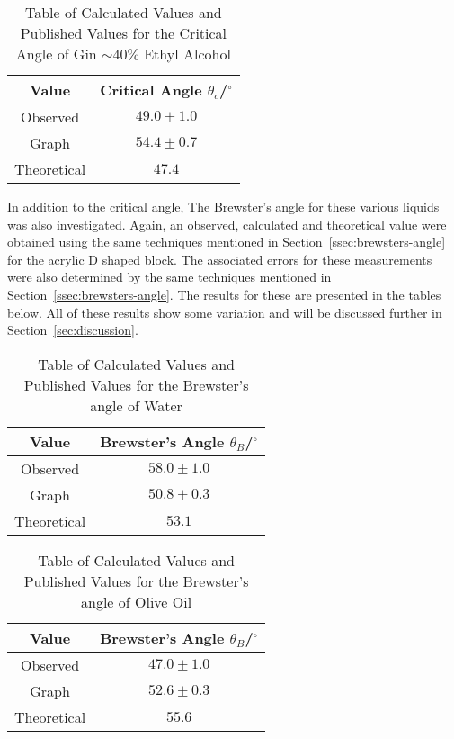\documentclass{article}
\newcommand{\secref}[2][Section~]{#1\ref{#2}}
\begin{document}
\vspace{5mm}
\begin{table*}[h]
\centering %
\caption{Table of Calculated Values and Published Values for the Critical Angle of Gin $\sim40\%$ Ethyl Alcohol}
\label{tab:table-gin2}
\begin{tabular}{|c|c|}
\hline
Value & Critical Angle $\theta_c$/$^{\circ}$ \\
\hline
Observed & $49.0\pm 1.0$  \\
\hline
Graph & $54.4 \pm 0.7$ \\
\hline
Theoretical \cite{Web02} & $47.4$ \\
\hline
\end{tabular}
\end{table*}

\cleardoublepage
\noindent
In addition to the critical angle, The Brewster's angle for these various liquids was also investigated. Again, an observed, calculated and theoretical value were obtained using the same techniques mentioned in \secref{ssec:brewsters-angle} for the acrylic D shaped block. The associated errors for these measurements were also determined by the same techniques mentioned in \secref{ssec:brewsters-angle}. The results for these are presented in the tables below. All of these results show some variation and will be discussed further in \secref{sec:discussion}.

\vspace{10mm}
\begin{table*}[h]
\centering %
\caption{Table of Calculated Values and Published Values for the Brewster's angle of Water}
\label{tab:table-water3}
\begin{tabular}{|c|c|}
\hline
Value & Brewster's Angle $\theta_B$/$^{\circ}$ \\
\hline
Observed & $58.0 \pm 1.0$  \\
\hline
Graph & $50.8 \pm 0.3$ \\
\hline
Theoretical \cite{Web01} & $53.1$ \\
\hline
\end{tabular}
\end{table*}

\vspace{10mm}
\begin{table*}[h]
\centering %
\caption{Table of Calculated Values and Published Values for the Brewster's angle of Olive Oil}
\label{tab:table-oil3}
\begin{tabular}{|c|c|}
\hline
Value & Brewster's Angle $\theta_B$/$^{\circ}$ \\
\hline
Observed & $47.0 \pm 1.0$  \\
\hline
Graph & $52.6 \pm 0.3$ \\
\hline
Theoretical \cite{Web01} & $55.6$ \\
\hline
\end{tabular}
\end{table*}
\end{document}

